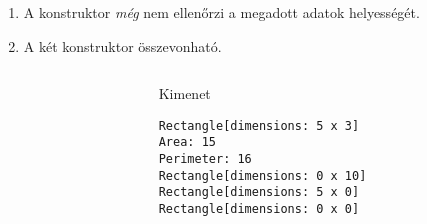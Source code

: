 \documentclass[usenames,dvipsnames,aspectratio=169]{beamer}
\begin{document}
\begin{frame}
    \begin{exampleblock}{}
        \footnotesize
        
    \end{exampleblock}
    \vfill
    \begin{enumerate}
        \item A konstruktor \emph{még} nem ellenőrzi a megadott adatok helyességét.
        \item A két konstruktor összevonható.
    \end{enumerate}
\end{frame}

\begin{frame}
    \begin{exampleblock}{}
        \scriptsize
        
    \end{exampleblock}
    \begin{exampleblock}{}
        \scriptsize
        
    \end{exampleblock}
\end{frame}

\begin{frame}[fragile]
    \begin{columns}
        \begin{column}{0.7\textwidth}
            \begin{exampleblock}{}
                \scriptsize
                
            \end{exampleblock}
        \end{column}
        \begin{column}{0.3\textwidth}
            \begin{block}{Kimenet}
                \vspace{-0.4cm}
                \scriptsize
                \begin{verbatim}
Rectangle[dimensions: 5 x 3]
Area: 15
Perimeter: 16
Rectangle[dimensions: 0 x 10]
Rectangle[dimensions: 5 x 0]
Rectangle[dimensions: 0 x 0]
\end{verbatim}
                \vspace{-0.4cm}
            \end{block}
        \end{column}
    \end{columns}
\end{frame}
\end{document}

